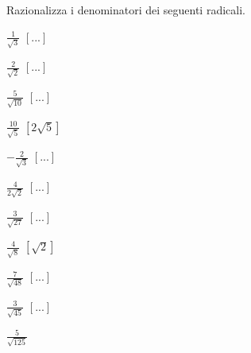 

\subsubsection*{}

\begin{esercizio}[\Ast]
 \label{ese:2.68}
Razionalizza i denominatori dei seguenti radicali.
 \begin{multicols}{4}
 \begin{enumeratea}
 \item \(\frac 1{\sqrt 3}\)
  \hfill \(\left[...\right]\)
 \item \(\frac 2{\sqrt 2}\)
  \hfill \(\left[...\right]\)
 \item \(\frac 5{\sqrt{10}}\)
  \hfill \(\left[...\right]\)
 \item \(\frac{10}{\sqrt 5}\)
  \hfill \(\left[2\sqrt 5\right]\)
 \item \(-\frac 2{\sqrt 3}\)
  \hfill \(\left[...\right]\)
 \item \(\frac 4{2\sqrt 2}\)
  \hfill \(\left[...\right]\)
 \item \(\frac 3{\sqrt{27}}\)
  \hfill \(\left[...\right]\)
 \item \(\frac 4{\sqrt 8}\)
  \hfill \(\left[\sqrt 2\right]\)
 \item \(\frac 7{\sqrt{48}}\)
  \hfill \(\left[...\right]\)
 \item \(\frac 3{\sqrt{45}}\)
  \hfill \(\left[...\right]\)
 \item \(\frac 5{\sqrt{125}}\)

\end{enumeratea}
\end{multicols}
\end{esercizio}
